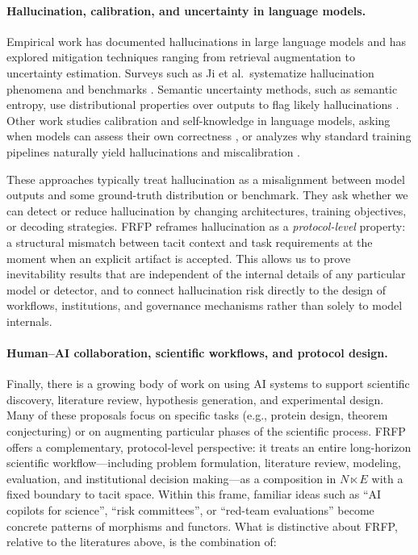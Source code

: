 \documentclass[11pt]{article}
\theoremstyle{definition}
\begin{document}
\paragraph{Hallucination, calibration, and uncertainty in language models.}
Empirical work has documented hallucinations in large language models and has explored mitigation techniques ranging from retrieval augmentation to uncertainty estimation. Surveys such as Ji et al.\ systematize hallucination phenomena and benchmarks \citep{ji2023hallucination_survey}. Semantic uncertainty methods, such as semantic entropy, use distributional properties over outputs to flag likely hallucinations \citep{zhou2023semantic_entropy}. Other work studies calibration and self-knowledge in language models, asking when models can assess their own correctness \citep{kadavath2022self_knowledge}, or analyzes why standard training pipelines naturally yield hallucinations and miscalibration \citep{kalai2024hallucination_explained}.

These approaches typically treat hallucination as a misalignment between model outputs and some ground-truth distribution or benchmark. They ask whether we can detect or reduce hallucination by changing architectures, training objectives, or decoding strategies. FRFP reframes hallucination as a \emph{protocol-level} property: a structural mismatch between tacit context and task requirements at the moment when an explicit artifact is accepted. This allows us to prove inevitability results that are independent of the internal details of any particular model or detector, and to connect hallucination risk directly to the design of workflows, institutions, and governance mechanisms rather than solely to model internals.

\paragraph{Human--AI collaboration, scientific workflows, and protocol design.}
Finally, there is a growing body of work on using AI systems to support scientific discovery, literature review, hypothesis generation, and experimental design. Many of these proposals focus on specific tasks (e.g., protein design, theorem conjecturing) or on augmenting particular phases of the scientific process. FRFP offers a complementary, protocol-level perspective: it treats an entire long-horizon scientific workflow---including problem formulation, literature review, modeling, evaluation, and institutional decision making---as a composition in $N \ltimes E$ with a fixed boundary to tacit space. Within this frame, familiar ideas such as ``AI copilots for science'', ``risk committees'', or ``red-team evaluations'' become concrete patterns of morphisms and functors. What is distinctive about FRFP, relative to the literatures above, is the combination of:
\end{document}
